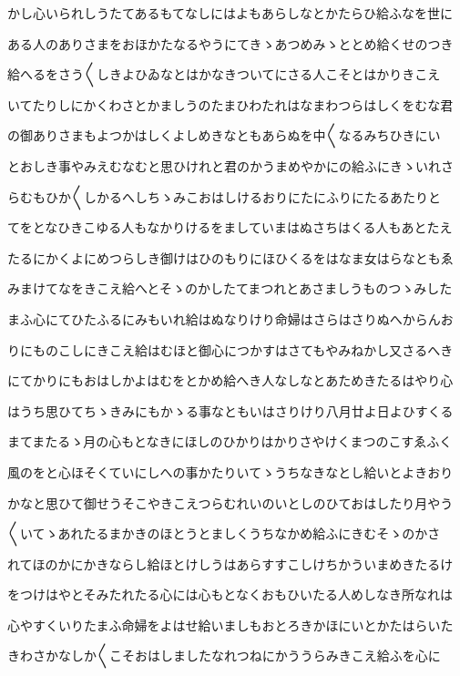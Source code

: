 \documentclass[a4paper,11pt,landscape]{ltjtarticle}
\begin{document}
かし心いられしうたてあるもてなしにはよもあらしなとかたらひ給ふなを世に
\par\medskip
ある人のありさまをおほかたなるやうにてきゝあつめみゝととめ給くせのつき
\par\medskip
給へるをさう〱しきよひゐなとはかなきついてにさる人こそとはかりきこえ
\par\medskip
いてたりしにかくわさとかましうのたまひわたれはなまわつらはしくをむな君
\par\medskip
の御ありさまもよつかはしくよしめきなともあらぬを中〱なるみちひきにい
\par\medskip
とおしき事やみえむなむと思ひけれと君のかうまめやかにの給ふにきゝいれさ
\par\medskip
らむもひか〱しかるへしちゝみこおはしけるおりにたにふりにたるあたりと
\par\medskip
てをとなひきこゆる人もなかりけるをましていまはぬさちはくる人もあとたえ
\par\medskip
たるにかくよにめつらしき御けはひのもりにほひくるをはなま女はらなともゑ
\par\medskip
みまけてなをきこえ給へとそゝのかしたてまつれとあさましうものつゝみした
\par\medskip
まふ心にてひたふるにみもいれ給はぬなりけり命婦はさらはさりぬへからんお
\par\medskip
りにものこしにきこえ給はむほと御心につかすはさてもやみねかし又さるへき
\par\medskip
にてかりにもおはしかよはむをとかめ給へき人なしなとあためきたるはやり心
\par\medskip
はうち思ひてちゝきみにもかゝる事なともいはさりけり八月廿よ日よひすくる
\par\medskip
まてまたるゝ月の心もとなきにほしのひかりはかりさやけくまつのこすゑふく
\par\medskip
風のをと心ほそくていにしへの事かたりいてゝうちなきなとし給いとよきおり
\par\medskip
かなと思ひて御せうそこやきこえつらむれいのいとしのひておはしたり月やう
\par\medskip
〱いてゝあれたるまかきのほとうとましくうちなかめ給ふにきむそゝのかさ
\par\medskip
れてほのかにかきならし給ほとけしうはあらすすこしけちかういまめきたるけ
\par\medskip
をつけはやとそみたれたる心には心もとなくおもひいたる人めしなき所なれは
\par\medskip
心やすくいりたまふ命婦をよはせ給いましもおとろきかほにいとかたはらいた
\par\medskip
きわさかなしか〱こそおはしましたなれつねにかううらみきこえ給ふを心に
\end{document}
